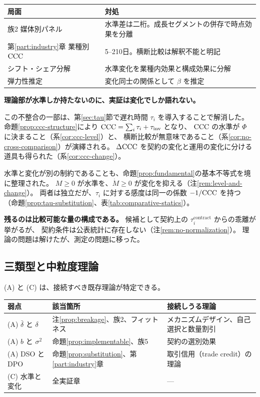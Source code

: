 \begin{center}
\begin{tabularx}{\textwidth}{@{}lX@{}}
\toprule
局面 & 対処 \\
\midrule
族2 媒体別パネル & 水準差は二桁。成長セグメントの併存で時点効果を分離 \\
第\ref{part:industry}章 業種別 $\mathrm{CCC}$ & 5--210日。横断比較は解釈不能と明記 \\
シフト・シェア分解 & 水準変化を業種内効果と構成効果に分解 \\
弾力性推定 & 変化同士の関係として $\beta$ を推定 \\
\bottomrule
\end{tabularx}
\label{tab:level-change-gap-response}
\end{center}

\textbf{理論部が水準しか持たないのに、実証は変化でしか語れない。}

この不整合の一部は、第\ref{sec:tau}節で遅れ時間 $\tau_i$ を導入することで解消した。
命題\ref{prop:ccc-structure}により $\mathrm{CCC}=\sum_i\tau_i+\tau_{\mathrm{inv}}$ となり、
$\mathrm{CCC}$ の水準が $\Phi$ に決まること（系\ref{cor:ccc-level}）と、
横断比較が無意味であること（系\ref{cor:no-cross-comparison}）が演繹される。
$\Delta\mathrm{CCC}$ を契約の変化と運用の変化に分ける道具も得られた（系\ref{cor:ccc-change}）。

水準と変化が別の制約であることも、命題\ref{prop:fundamental}の基本不等式を境に整理された。
$M\geq 0$ が水準を、$\dot M\geq 0$ が変化を抑える（注\ref{rem:level-and-change}）。
両者は独立だが、$\tau_i$ に対する感度は同一の係数 $-1/\mathrm{CCC}$ を持つ
（命題\ref{prop:tau-substitution}、表\ref{tab:comparative-statics}）。

\textbf{残るのは比較可能な量の構成である。}
候補として契約上の $\tau_i^{\mathrm{contract}}$ からの乖離が挙がるが、
契約条件は公表統計に存在しない（注\ref{rem:no-normalization}）。
理論の問題は解けたが、測定の問題に移った。

\subsection{三類型と中粒度理論}

(A) と (C) は、接続すべき既存理論が特定できる。

\begin{center}
\begin{tabularx}{\textwidth}{@{}lXX@{}}
\toprule
弱点 & 該当箇所 & 接続しうる理論 \\
\midrule
(A) $\bar\delta$ と $\delta$ & 注\ref{prop:breakage}、族2、フィットネス & メカニズムデザイン、自己選択と数量割引 \\
(A) $b$ と $\sigma^2$ & 命題\ref{prop:implementable}、族5 & 契約の選別効果 \\
(A) DSO と DPO & 命題\ref{prop:substitution}、第\ref{part:industry}章 & 取引信用（trade credit）の理論 \\
(C) 水準と変化 & 全実証章 & --- \\
\bottomrule
\end{tabularx}
\label{tab:weakness-mid-level-theory}
\end{center}


